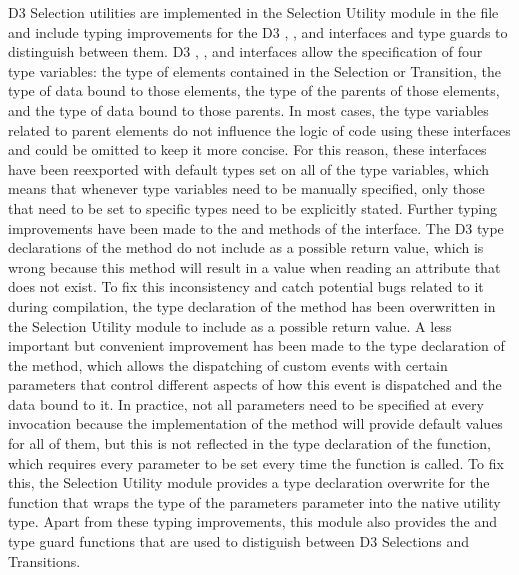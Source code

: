 D3 Selection utilities are implemented in the Selection
Utility module in the  file and include
typing improvements for the D3 , ,
and  interfaces and type guards to
distinguish between them. D3 , , and
 interfaces allow the specification of
four type variables: the type of elements contained in the Selection
or Transition, the type of data bound to those elements, the type of
the parents of those elements, and the type of data bound to those
parents. In most cases, the type variables related to parent elements
do not influence the logic of code using these interfaces and could be
omitted to keep it more concise. For this reason, these interfaces
have been reexported with default types set on all of the type
variables, which means that whenever type variables need to be
manually specified, only those that need to be set to specific types
need to be explicitly stated. Further typing improvements have been
made to the  and  methods of the
 interface. The D3 type declarations of the
 method do not include  as a possible
return value, which is wrong because this method will result in a
 value when reading an attribute that does not exist. To
fix this inconsistency and catch potential bugs related to it during
compilation, the type declaration of the  method
has been overwritten in the Selection Utility module to
include  as a possible return value. A less important but
convenient improvement has been made to the type declaration of the
 method, which allows the dispatching of
custom events with certain parameters that control different aspects
of how this event is dispatched and the data bound to it. In practice,
not all parameters need to be specified at every invocation because
the implementation of the  method will
provide default values for all of them, but this is not reflected in
the type declaration of the function, which requires every parameter
to be set every time the function is called. To fix this, the
Selection Utility module provides a type declaration
overwrite for the  function that wraps the
type of the parameters parameter into the native 
utility type. Apart from these typing improvements, this module also
provides the  and  type guard
functions that are used to distiguish between D3 Selections and
Transitions.



